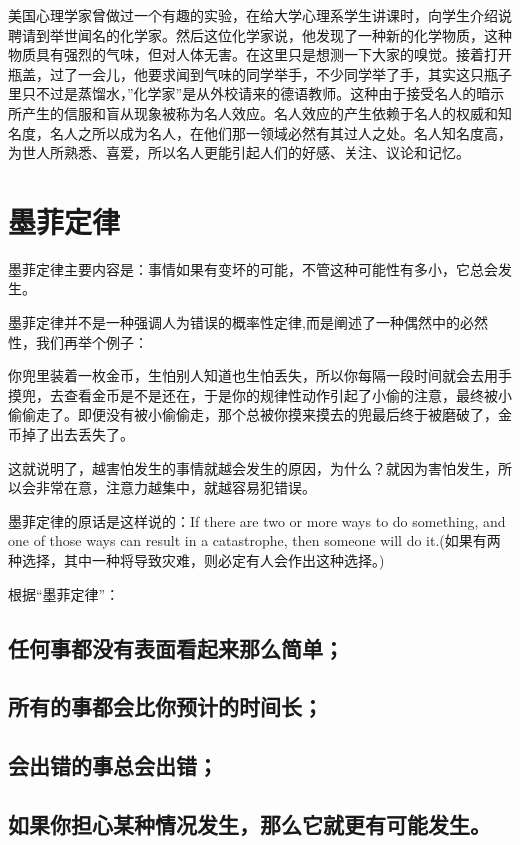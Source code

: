\documentclass[11pt]{ctexart}
\begin{document}
美国心理学家曾做过一个有趣的实验，在给大学心理系学生讲课时，向学生介绍说聘请到举世闻名的化学家。然后这位化学家说，他发现了一种新的化学物质，这种物质具有强烈的气味，但对人体无害。在这里只是想测一下大家的嗅觉。接着打开瓶盖，过了一会儿，他要求闻到气味的同学举手，不少同学举了手，其实这只瓶子里只不过是蒸馏水，''化学家''是从外校请来的德语教师。这种由于接受名人的暗示所产生的信服和盲从现象被称为名人效应。名人效应的产生依赖于名人的权威和知名度，名人之所以成为名人，在他们那一领域必然有其过人之处。名人知名度高，为世人所熟悉、喜爱，所以名人更能引起人们的好感、关注、议论和记忆。
\section{墨菲定律}
\label{sec-69}


墨菲定律主要内容是：事情如果有变坏的可能，不管这种可能性有多小，它总会发生。

墨菲定律并不是一种强调人为错误的概率性定律,而是阐述了一种偶然中的必然性，我们再举个例子：

你兜里装着一枚金币，生怕别人知道也生怕丢失，所以你每隔一段时间就会去用手摸兜，去查看金币是不是还在，于是你的规律性动作引起了小偷的注意，最终被小偷偷走了。即便没有被小偷偷走，那个总被你摸来摸去的兜最后终于被磨破了，金币掉了出去丢失了。

这就说明了，越害怕发生的事情就越会发生的原因，为什么？就因为害怕发生，所以会非常在意，注意力越集中，就越容易犯错误。

墨菲定律的原话是这样说的：If there are two or more ways to do something, and one of those ways can result in a catastrophe, then someone will do it.(如果有两种选择，其中一种将导致灾难，则必定有人会作出这种选择。)

根据“墨菲定律”：
\subsection{任何事都没有表面看起来那么简单；}
\label{sec-69-1}
\subsection{所有的事都会比你预计的时间长；}
\label{sec-69-2}
\subsection{会出错的事总会出错；}
\label{sec-69-3}
\subsection{如果你担心某种情况发生，那么它就更有可能发生。}
\label{sec-69-4}
\end{document}
